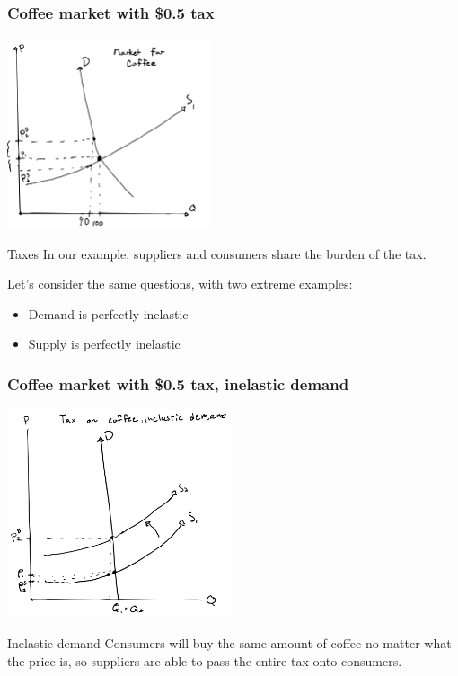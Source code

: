 \documentclass[aspectratio=169]{beamer}
\begin{document}
\begin{frame}
    \frametitle{Coffee market with \$0.5 tax}
    \centering
    \includegraphics[width = 0.45\textwidth,keepaspectratio]{coffee_tax_1b.png}
\end{frame}

\begin{frame}{Taxes}
    In our example, suppliers and consumers share the burden of the tax.

    \vspace{5mm}

    Let's consider the same questions, with two extreme examples:
    \begin{itemize}
        \item Demand is perfectly inelastic
        \item Supply is perfectly inelastic
    \end{itemize}
\end{frame}

\begin{frame}
    \frametitle{Coffee market with \$0.5 tax, inelastic demand}
    \centering
    \includegraphics[width = 0.5\textwidth,keepaspectratio]{coffee_tax_id.png}
\end{frame}

\begin{frame}{Inelastic demand}
    Consumers will buy the same amount of coffee no matter what the price is, so suppliers are able to pass the entire tax onto consumers.
\end{frame}
\end{document}
